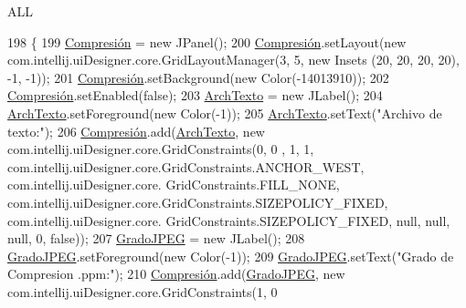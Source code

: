 A\+LL 
\begin{DoxyCode}
198                                  \{
199         \hyperlink{classpresentacion_1_1form_1_1PopUp__Comp_a5769b499f21466bae765c41428512966}{Compresión} = \textcolor{keyword}{new} JPanel();
200         \hyperlink{classpresentacion_1_1form_1_1PopUp__Comp_a5769b499f21466bae765c41428512966}{Compresión}.setLayout(\textcolor{keyword}{new} com.intellij.uiDesigner.core.GridLayoutManager(3, 5, \textcolor{keyword}{new} Insets
      (20, 20, 20, 20), -1, -1));
201         \hyperlink{classpresentacion_1_1form_1_1PopUp__Comp_a5769b499f21466bae765c41428512966}{Compresión}.setBackground(\textcolor{keyword}{new} Color(-14013910));
202         \hyperlink{classpresentacion_1_1form_1_1PopUp__Comp_a5769b499f21466bae765c41428512966}{Compresión}.setEnabled(\textcolor{keyword}{false});
203         \hyperlink{classpresentacion_1_1form_1_1PopUp__Comp_a1b40d49127cf9752ea464d6660f04673}{ArchTexto} = \textcolor{keyword}{new} JLabel();
204         \hyperlink{classpresentacion_1_1form_1_1PopUp__Comp_a1b40d49127cf9752ea464d6660f04673}{ArchTexto}.setForeground(\textcolor{keyword}{new} Color(-1));
205         \hyperlink{classpresentacion_1_1form_1_1PopUp__Comp_a1b40d49127cf9752ea464d6660f04673}{ArchTexto}.setText(\textcolor{stringliteral}{"Archivo de texto:"});
206         \hyperlink{classpresentacion_1_1form_1_1PopUp__Comp_a5769b499f21466bae765c41428512966}{Compresión}.add(\hyperlink{classpresentacion_1_1form_1_1PopUp__Comp_a1b40d49127cf9752ea464d6660f04673}{ArchTexto}, \textcolor{keyword}{new} com.intellij.uiDesigner.core.GridConstraints(0, 0
      , 1, 1, com.intellij.uiDesigner.core.GridConstraints.ANCHOR\_WEST, com.intellij.uiDesigner.core.
      GridConstraints.FILL\_NONE, com.intellij.uiDesigner.core.GridConstraints.SIZEPOLICY\_FIXED, com.intellij.uiDesigner.core.
      GridConstraints.SIZEPOLICY\_FIXED, null, null, null, 0, \textcolor{keyword}{false}));
207         \hyperlink{classpresentacion_1_1form_1_1PopUp__Comp_acf726751a39641f547274bfe8176fedd}{GradoJPEG} = \textcolor{keyword}{new} JLabel();
208         \hyperlink{classpresentacion_1_1form_1_1PopUp__Comp_acf726751a39641f547274bfe8176fedd}{GradoJPEG}.setForeground(\textcolor{keyword}{new} Color(-1));
209         \hyperlink{classpresentacion_1_1form_1_1PopUp__Comp_acf726751a39641f547274bfe8176fedd}{GradoJPEG}.setText(\textcolor{stringliteral}{"Grado de Compresion .ppm:"});
210         \hyperlink{classpresentacion_1_1form_1_1PopUp__Comp_a5769b499f21466bae765c41428512966}{Compresión}.add(\hyperlink{classpresentacion_1_1form_1_1PopUp__Comp_acf726751a39641f547274bfe8176fedd}{GradoJPEG}, \textcolor{keyword}{new} com.intellij.uiDesigner.core.GridConstraints(1, 0

\end{DoxyCode}
